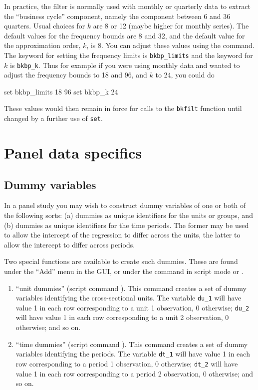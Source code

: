 In practice, the filter is normally used with monthly or quarterly
data to extract the ``business cycle'' component, namely the component
between 6 and 36 quarters. Usual choices for $k$ are 8 or 12 (maybe
higher for monthly series).  The default values for the frequency
bounds are 8 and 32, and the default value for the approximation
order, $k$, is 8. You can adjust these values using the 
command. The keyword for setting the frequency limits is
\verb+bkbp_limits+ and the keyword for $k$ is \verb+bkbp_k+.  Thus for
example if you were using monthly data and wanted to adjust the
frequency bounds to 18 and 96, and $k$ to 24, you could do

\begin{code}
set bkbp_limits 18 96
set bkbp_k 24
\end{code}

These values would then remain in force for calls to the \verb+bkfilt+
function until changed by a further use of \verb+set+.
      
\section{Panel data specifics}
\label{panel-genr}

\subsection{Dummy variables}
\label{dummies}

In a panel study you may wish to construct dummy variables of one or
both of the following sorts: (a) dummies as unique identifiers for the
units or groups, and (b) dummies as unique identifiers for the time
periods.  The former may be used to allow the intercept of the
regression to differ across the units, the latter to allow the
intercept to differ across periods.

Two special functions are available to create such dummies.  These are
found under the ``Add'' menu in the GUI, or under the 
command in script mode or .

\begin{enumerate}
\item ``unit dummies'' (script command ).  This
  command creates a set of dummy variables identifying the
  cross-sectional units.  The variable \verb+du_1+ will have value 1
  in each row corresponding to a unit 1 observation, 0 otherwise;
  \verb+du_2+ will have value 1 in each row corresponding to a unit 2
  observation, 0 otherwise; and so on.
\item ``time dummies'' (script command ).  This
  command creates a set of dummy variables identifying the periods.
  The variable \verb+dt_1+ will have value 1 in each row
  corresponding to a period 1 observation, 0 otherwise; \verb+dt_2+
  will have value 1 in each row corresponding to a period 2
  observation, 0 otherwise; and so on.
\end{enumerate}

